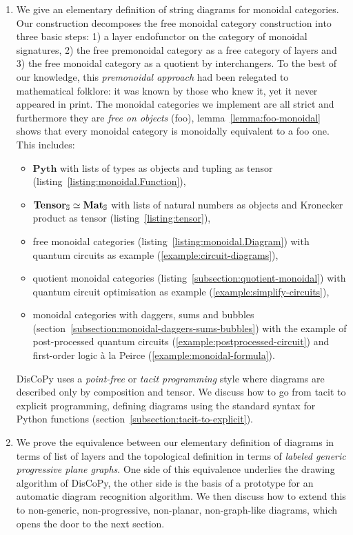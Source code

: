 \begin{enumerate}
\item We give an elementary definition of string diagrams for monoidal categories.
Our construction decomposes the free monoidal category construction into three basic steps: 1) a layer endofunctor on the category of monoidal signatures, 2) the free premonoidal category as a free category of layers and 3) the free monoidal category as a quotient by interchangers.
To the best of our knowledge, this \emph{premonoidal approach} had been relegated to mathematical folklore: it was known by those who knew it, yet it never appeared in print.
The monoidal categories we implement are all strict and furthermore they are \emph{free on objects} (foo), lemma~\ref{lemma:foo-monoidal} shows that every monoidal category is monoidally equivalent to a foo one.
This includes:
\begin{itemize}
    \item $\mathbf{Pyth}$ with lists of types as objects and tupling as tensor (listing~\ref{listing:monoidal.Function}),
    \item $\mathbf{Tensor}_\S \simeq \mathbf{Mat}_\S$ with lists of natural numbers as objects and Kronecker product as tensor (listing~\ref{listing:tensor}),
    \item free monoidal categories (listing~\ref{listing:monoidal.Diagram}) with quantum circuits as example (\ref{example:circuit-diagrams}),
    \item quotient monoidal categories (listing~\ref{subsection:quotient-monoidal}) with quantum circuit optimisation as example (\ref{example:simplify-circuits}),
    \item monoidal categories with daggers, sums and bubbles (section~\ref{subsection:monoidal-daggers-sums-bubbles}) with the example of post-processed quantum circuits (\ref{example:postprocessed-circuit}) and first-order logic à la Peirce (\ref{example:monoidal-formula}).
\end{itemize}
DisCoPy uses a \emph{point-free} or \emph{tacit programming} style where diagrams are described only by composition and tensor.
We discuss how to go from tacit to explicit programming, defining diagrams using the standard syntax for Python functions (section~\ref{subsection:tacit-to-explicit}).

\item We prove the equivalence between our elementary definition of diagrams in terms of list of layers and the topological definition in terms of \emph{labeled generic progressive plane graphs}.
One side of this equivalence underlies the drawing algorithm of DisCoPy, the other side is the basis of a prototype for an automatic diagram recognition algorithm.
We then discuss how to extend this to non-generic, non-progressive, non-planar, non-graph-like diagrams, which opens the door to the next section.


\end{enumerate}
